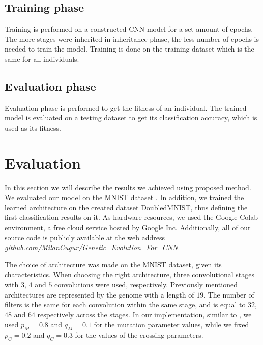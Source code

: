 \documentclass[eng]{simposium}
\begin{document}
\subsection{Training phase} 
Training is performed on a constructed CNN model for a set amount of epochs.  
The more stages were inherited in inheritance phase, the less number of epochs is needed to train the model. 
Training is done on the training dataset which is the same for all individuals. 

\subsection{Evaluation phase} 
Evaluation phase is performed to get the fitness of an individual. 
The trained model is evaluated on a testing dataset to get its classification accuracy, which is used as its fitness. 

\section{Evaluation} 

In this section we will describe the results we achieved using proposed method.  
We evaluated our model on the MNIST dataset \cite{8}. In addition, we trained the learned architecture on the  
created dataset DoubledMNIST, thus defining the first classification results on it.  
As hardware resources, we used the Google Colab environment, a free cloud service hosted by Google Inc. 
Additionally, all of our source code is publicly available at the web address \textit{github.com/MilanCugur/Genetic\_Evolution\_For\_CNN}.  

The choice of architecture was made on the MNIST dataset, given its characteristics.  
When choosing the right architecture, three convolutional stages with $3$, $4$ and $5$ convolutions were used, respectively.  
Previously mentioned architectures are represented by the genome with a length of $19$. 
The number of filters is the same for each convolution within the same stage, and is equal to $32$, $48$ and $64$ respectively across the stages.  
In our implementation, similar to \cite{4}, we used $p_M=0.8$ and $q_M=0.1$ for the mutation parameter values, while we fixed $p_C=0.2$ and $q_C=0.3$ for the values of the crossing parameters. 
\end{document}
